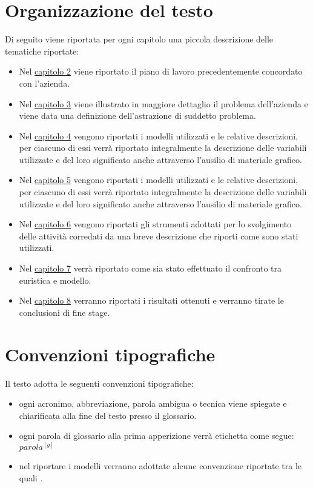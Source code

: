 \section{Organizzazione del testo}
Di seguito viene riportata per ogni capitolo una piccola descrizione delle tematiche riportate:
\begin{itemize}
\item Nel \hyperlink{(chap:processi_metodologie)}{capitolo 2} viene riportato il piano di lavoro precedentemente concordato con l'azienda.
\item Nel \hyperlink{(chap:processi_metodologie)}{capitolo 3} viene illustrato in maggiore dettaglio il problema dell'azienda e viene data una  definizione dell'astrazione di suddetto problema.
\item Nel \hyperlink{(chap:processi_metodologie)}{capitolo 4} vengono riportati i modelli utilizzati e le relative descrizioni, per ciascuno di essi verrà riportato integralmente la descrizione delle variabili utilizzate e del loro significato anche attraverso l'ausilio di materiale grafico.
\item Nel \hyperlink{(chap:processi_metodologie)}{capitolo 5} vengono riportati i modelli utilizzati e le relative descrizioni, per ciascuno di essi verrà riportato integralmente la descrizione delle variabili utilizzate e del loro significato anche attraverso l'ausilio di materiale grafico.
\item Nel \hyperlink{(chap:processi_metodologie)}{capitolo 6} vengono riportati gli strumenti adottati per lo svolgimento delle attività corredati da una breve descrizione che riporti come sono stati utilizzati.
\item Nel \hyperlink{(chap:processi_metodologie)}{capitolo 7} verrà riportato come sia stato effettuato il confronto tra euristica e modello.
\item Nel \hyperlink{(chap:processi_metodologie)}{capitolo 8} verranno riportati i risultati ottenuti e verranno tirate le conclusioni di fine stage.
\end{itemize}
\section{Convenzioni tipografiche}
Il testo adotta le seguenti convenzioni tipografiche:
\begin{itemize}
    \item ogni acronimo, abbreviazione, parola ambigua o tecnica viene spiegate e chiarificata alla fine del testo presso il glossario.
    \item ogni parola di glossario alla prima apperizione verrà etichetta come segue: $parola^{[g]}$
    \item nel riportare i modelli verranno adottate alcune convenzione riportate tra le quali   .
\end{itemize}